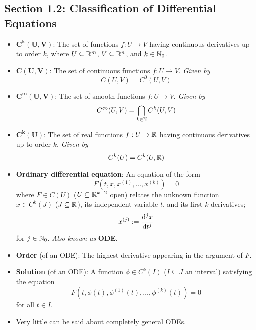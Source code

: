 \documentclass[../notes.tex]{subfiles}
\begin{document}
\subsection*{Section 1.2: Classification of Differential Equations}
\begin{itemize}
    \item {}$\bm{C^k(U,V)}$: The set of functions $f:U\to V$ having continuous derivatives up to order $k$, where $U\subseteq\mathbb{R}^m$, $V\subseteq\mathbb{R}^n$, and $k\in\mathbb{N}_0$.
    \item $\bm{C(U,V)}$: The set of continuous functions $f:U\to V$. \emph{Given by}
    \begin{equation*}
        C(U,V) = C^0(U,V)
    \end{equation*}
    \item $\bm{C^\infty(U,V)}$: The set of smooth functions $f:U\to V$. \emph{Given by}
    \begin{equation*}
        C^\infty(U,V) = \bigcap_{k\in\mathbb{N}}C^k(U,V)
    \end{equation*}
    \item $\bm{C^k(U)}$: The set of real functions $f:U\to\mathbb{R}$ having continuous derivatives up to order $k$. \emph{Given by}
    \begin{equation*}
        C^k(U) = C^k(U,\mathbb{R})
    \end{equation*}
    \item \textbf{Ordinary differential equation}: An equation of the form
    \begin{equation*}
        F(t,x,x^{(1)},\dots,x^{(k)}) = 0
    \end{equation*}
    where $F\in C(U)$ ($U\subseteq\mathbb{R}^{k+2}$ open) relates the unknown function $x\in C^k(J)$ ($J\subseteq\mathbb{R}$), its independent variable $t$, and its first $k$ derivatives;
    \begin{equation*}
        x^{(j)} := \dv[j]{x}{t}
    \end{equation*}
    for $j\in\mathbb{N}_0$. \emph{Also known as} \textbf{ODE}.
    \item \textbf{Order} (of an ODE): The highest derivative appearing in the argument of $F$.
    \item \textbf{Solution} (of an ODE): A function $\phi\in C^k(I)$ ($I\subseteq J$ an interval) satisfying the equation
    \begin{equation*}
        F(t,\phi(t),\phi^{(1)}(t),\dots,\phi^{(k)}(t)) = 0
    \end{equation*}
    for all $t\in I$.
    \item Very little can be said about completely general ODEs.

\end{itemize}
\end{document}
